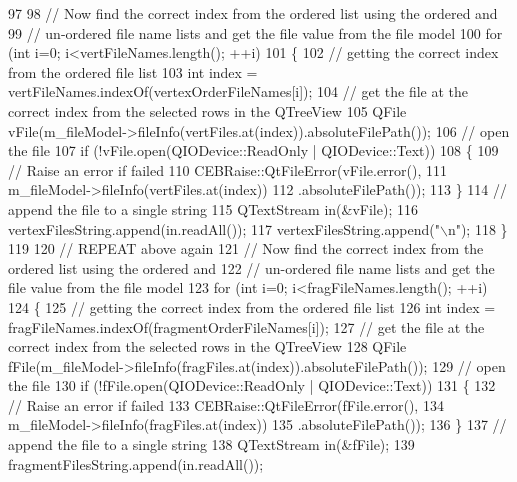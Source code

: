 \begin{DoxyCode}
{97 
98   \textcolor{comment}{// Now find the correct index from the ordered list using the ordered and}
99   \textcolor{comment}{// un-ordered file name lists and get the file value from the file model}
100   \textcolor{keywordflow}{for} (\textcolor{keywordtype}{int} i=0; i<vertFileNames.length(); ++i)
101   \{
102     \textcolor{comment}{// getting the correct index from the ordered file list}
103     \textcolor{keywordtype}{int} index = vertFileNames.indexOf(vertexOrderFileNames[i]);
104     \textcolor{comment}{// get the file at the correct index from the selected rows in the QTreeView}
105     QFile vFile(m_fileModel->fileInfo(vertFiles.at(index)).absoluteFilePath());
106     \textcolor{comment}{// open the file}
107     \textcolor{keywordflow}{if} (!vFile.open(QIODevice::ReadOnly | QIODevice::Text))
108     \{
109       \textcolor{comment}{// Raise an error if failed}
110       CEBRaise::QtFileError(vFile.error(),
111                             m_fileModel->fileInfo(vertFiles.at(index))
112                                                            .absoluteFilePath());
113     \}
114     \textcolor{comment}{// append the file to a single string}
115     QTextStream in(&vFile);
116     vertexFilesString.append(in.readAll());
117     vertexFilesString.append(\textcolor{stringliteral}{"\(\backslash\)n"});
118   \}
119 
120   \textcolor{comment}{// REPEAT above again}
121   \textcolor{comment}{// Now find the correct index from the ordered list using the ordered and}
122   \textcolor{comment}{// un-ordered file name lists and get the file value from the file model}
123   \textcolor{keywordflow}{for} (\textcolor{keywordtype}{int} i=0; i<fragFileNames.length(); ++i)
124   \{
125     \textcolor{comment}{// getting the correct index from the ordered file list}
126     \textcolor{keywordtype}{int} index = fragFileNames.indexOf(fragmentOrderFileNames[i]);
127     \textcolor{comment}{// get the file at the correct index from the selected rows in the QTreeView}
128     QFile fFile(m_fileModel->fileInfo(fragFiles.at(index)).absoluteFilePath());
129     \textcolor{comment}{// open the file}
130     \textcolor{keywordflow}{if} (!fFile.open(QIODevice::ReadOnly | QIODevice::Text))
131     \{
132       \textcolor{comment}{// Raise an error if failed}
133       CEBRaise::QtFileError(fFile.error(),
134                             m_fileModel->fileInfo(fragFiles.at(index))
135                                                            .absoluteFilePath());
136     \}
137     \textcolor{comment}{// append the file to a single string}
138     QTextStream in(&fFile);
139     fragmentFilesString.append(in.readAll());
}
\end{DoxyCode}
